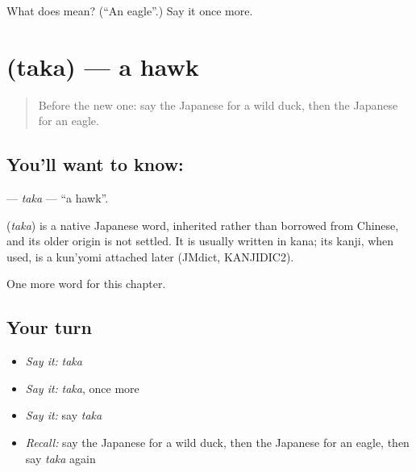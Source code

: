 \begin{tcolorbox}[breakable,colback=teal!4,colframe=teal!35!black,title={Before you move on}]
What does  mean? (\textquotedblleft{}An eagle\textquotedblright{}.) Say it once more.
\end{tcolorbox}
\section[\texorpdfstring{\ja{たか} (taka)}{たか (taka)}]{ (taka) — a hawk}

\label{lesson:JA-C109-taka}



\begin{quote}
Before the new one: say the Japanese for a wild duck, then the Japanese for an eagle.
\end{quote}

\subsection*{You'll want to know: }
\textbf{} — \emph{taka} — \textquotedblleft{}a hawk\textquotedblright{}.

\begin{cousinweb}
\textbf{} (\emph{taka}) is a native Japanese word, inherited rather than borrowed from Chinese, and its older origin is not settled. It is usually written in kana; its kanji, when used, is a kun'yomi attached later (JMdict, KANJIDIC2).
\end{cousinweb}

\begin{grammarlens}[title={What you've built}]
One more word for this chapter.
\end{grammarlens}

\subsection*{Your turn}
\begin{itemize}
\raggedright
  \item \emph{Say it:} \emph{taka}
  \item \emph{Say it:} \emph{taka}, once more
  \item \emph{Say it:} say \emph{taka}
  \item \emph{Recall:} say the Japanese for a wild duck, then the Japanese for an eagle, then say \emph{taka} again
\end{itemize}

